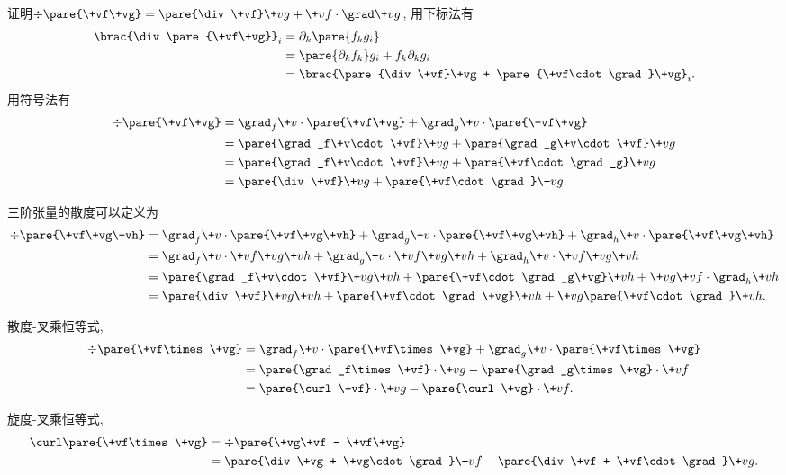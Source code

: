 \documentclass[hidelinks]{ctexart}
\begin{document}
\begin{ex}
    证明$\div\pare{\+vf\+vg} = \pare{\div\+vf}\+vg + \+vf\cdot \grad \+vg$, 用下标法有
    \begin{align*}
        \brac{\div\pare{\+vf\+vg}}_i &= \partial_k\pare{f_kg_i} \\
        &= \pare{\partial_k f_k} g_i + f_k\partial_k g_i \\
        &= \brac{\pare{\div \+vf}\+vg + \pare{\+vf\cdot\grad}\+vg}_i.
    \end{align*}
    用符号法有
    \begin{align*}
        \div\pare{\+vf\+vg} &= \grad_f\+v\cdot\pare{\+vf\+vg} + \grad_g\+v\cdot\pare{\+vf\+vg} \\
        &= \pare{\grad_f\+v\cdot\+vf}\+vg + \pare{\grad_g\+v\cdot\+vf}\+vg \\
        &= \pare{\grad_f\+v\cdot\+vf}\+vg + \pare{\+vf\cdot \grad_g}\+vg \\
        &= \pare{\div\+vf}\+vg + \pare{\+vf\cdot\grad}\+vg.
    \end{align*}
\end{ex}
\begin{ex}
    三阶张量的散度可以定义为
    \begin{align*}
        \div\pare{\+vf\+vg\+vh} &= \grad_f\+v\cdot\pare{\+vf\+vg\+vh} + \grad_g\+v\cdot\pare{\+vf\+vg\+vh} + \grad_h\+v\cdot\pare{\+vf\+vg\+vh} \\
        &= \grad_f\+v\cdot \+vf\+vg\+vh + \grad_g\+v\cdot\+vf\+vg\+vh + \grad_h\+v\cdot\+vf\+vg\+vh \\
        &= {\pare{\grad_f\+v\cdot \+vf}\+vg\+vh} + {\pare{\+vf\cdot\grad_g\+vg}\+vh} + {\+vg\+vf\cdot\grad_h\+vh} \\
        &= \pare{\div\+vf}\+vg\+vh + \pare{\+vf\cdot\grad\+vg}\+vh + \+vg\pare{\+vf\cdot\grad}\+vh.
    \end{align*}
\end{ex}
\begin{ex}
    散度-叉乘恒等式,
    \begin{align*}
        \div\pare{\+vf\times\+vg} &= \grad_f\+v\cdot\pare{\+vf\times\+vg} + \grad_g\+v\cdot\pare{\+vf\times\+vg} \\
        &= \pare{\grad_f\times\+vf}\cdot\+vg - \pare{\grad_g\times\+vg}\cdot\+vf \\
        &= \pare{\curl \+vf}\cdot \+vg - \pare{\curl \+vg} \cdot \+vf.
    \end{align*}
\end{ex}
\begin{ex}
    旋度-叉乘恒等式,
    \begin{align*}
        \curl\pare{\+vf\times \+vg} &= \div\pare{\+vg\+vf - \+vf\+vg} \\
        &= \pare{\div \+vg + \+vg\cdot\grad}\+vf - \pare{\div \+vf + \+vf\cdot\grad} \+vg.
    \end{align*}
\end{ex}
\end{document}
